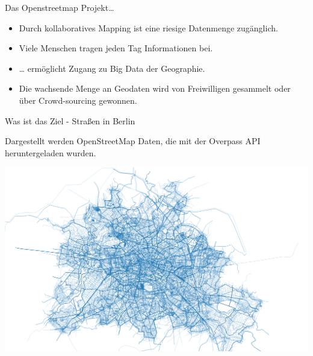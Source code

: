 \documentclass[ignorenonframetext,]{beamer}
\providecommand{\tightlist}{%
  \setlength{\itemsep}{0pt}\setlength{\parskip}{0pt}}
\begin{document}
\begin{frame}{Das Openstreetmap Projekt\ldots{}}

\begin{itemize}
\tightlist
\item
  Durch kollaboratives Mapping ist eine riesige Datenmenge zugänglich.
\item
  Viele Menschen tragen jeden Tag Informationen bei.
\item
  \ldots{} ermöglicht Zugang zu Big Data der Geographie.
\item
  Die wachsende Menge an Geodaten wird von Freiwilligen gesammelt oder
  über Crowd-sourcing gewonnen.
\end{itemize}

\end{frame}

\begin{frame}{Was ist das Ziel - Straßen in Berlin}

Dargestellt werden OpenStreetMap Daten, die mit der Overpass API
heruntergeladen wurden.

\includegraphics{figure/streets_Berlin2.png}

\end{frame}
\end{document}
